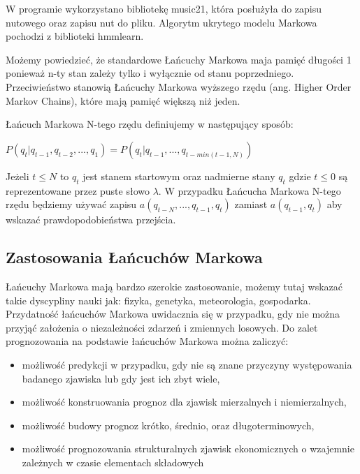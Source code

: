 W programie wykorzystano bibliotekę music21, która posłużyła do zapisu nutowego oraz zapisu nut do pliku. Algorytm ukrytego modelu Markowa pochodzi z biblioteki hmmlearn.

Możemy powiedzieć, że standardowe Łańcuchy Markowa maja pamięć długości 1 ponieważ n-ty stan zależy tylko i wyłącznie od stanu poprzedniego. Przeciwieństwo stanowią Łańcuchy Markowa wyższego rzędu (ang. Higher Order Markov Chains), które mają pamięć większą niż jeden. 

\begin{definicja}
	Łańcuch Markowa N-tego rzędu definiujemy w następujący sposób:
	\begin{center}
		
		$P(q_{t} | q_{t-1}, q_{t-2}, ..., q_{1}) = P(q_{t} | q_{t-1}, ..., q_{t-min(t-1, N)})$
		
	\end{center}
	Jeżeli $t \leq N$ to $q_{t}$ jest stanem startowym oraz nadmierne stany $q_{t}$ gdzie $t \le 0$ są reprezentowane przez puste słowo $\lambda$. W przypadku Łańcucha Markowa N-tego rzędu będziemy używać zapisu $a(q_{t-N}, ..., q_{t-1}, q_{t})$ zamiast $a(q_{t-1}, q_{t})$ aby wskazać prawdopodobieństwa przejścia. 
\end{definicja}


\subsection{Zastosowania Łańcuchów Markowa}

Łańcuchy Markowa mają bardzo szerokie zastosowanie, możemy tutaj wskazać takie dyscypliny nauki jak: fizyka, genetyka, meteorologia, gospodarka. Przydatność łańcuchów Markowa uwidacznia się w przypadku, gdy nie można przyjąć założenia o niezależności zdarzeń i zmiennych losowych. Do zalet prognozowania na podstawie łańcuchów Markowa można zaliczyć:
\begin{itemize}
	\item możliwość predykcji w przypadku, gdy nie są znane przyczyny występowania badanego zjawiska lub gdy jest ich zbyt wiele,
	\item możliwość konstruowania prognoz dla zjawisk mierzalnych i niemierzalnych,
	\item możliwość budowy prognoz krótko, średnio, oraz długoterminowych,
	\item możliwość prognozowania strukturalnych zjawisk ekonomicznych o wzajemnie zależnych w czasie elementach składowych
\end{itemize}
	

